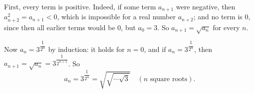 First, every term is positive. Indeed, if some term $a_{n+1}$ were negative, then $a_{n+2}^2=a_{n+1}<0$, which is impossible for a real number $a_{n+2}$; and no term is $0$, since then all earlier terms would be $0$, but $a_0=3$. So $a_{n+1}=\sqrt{a_n}$ for every $n$.

Now $a_n=3^{\dfrac{1}{2^n}}$ by induction: it holds for $n=0$, and if $a_n=3^{\dfrac1{2^n}}$, then $a_{n+1}=\sqrt{a_n}=3^{\dfrac{1}{2^{n+1}}}$. So
\[a_n=\boxed{3^{\dfrac{1}{2^n}}}=\sqrt{\sqrt{\cdots\sqrt3}}\quad(n\text{ square roots}).\]
